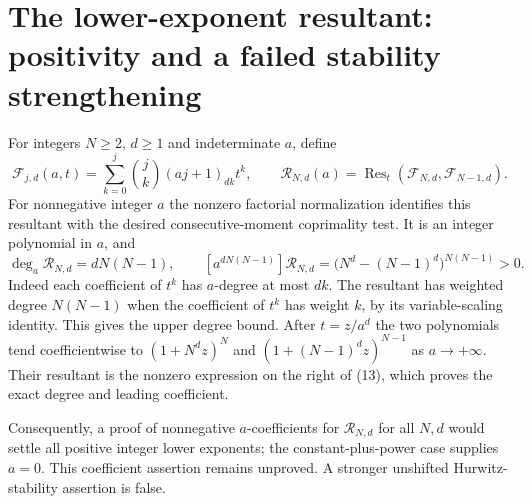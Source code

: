 \documentclass[11pt]{article}
\begin{document}
\section{The lower-exponent resultant: positivity and a failed stability strengthening}
For integers $N\ge2$, $d\ge1$ and indeterminate $a$, define
\[
 \mathcal F_{j,d}(a,t)=
   \sum_{k=0}^j\binom jk(aj+1)_{dk}t^k,\qquad
 \mathcal R_{N,d}(a)=
   \operatorname{Res}_t(\mathcal F_{N,d},\mathcal F_{N-1,d}).
\]
For nonnegative integer $a$ the nonzero factorial normalization
identifies this resultant with the desired consecutive-moment
coprimality test. It is an integer polynomial in $a$, and
\[
 \deg_a\mathcal R_{N,d}=dN(N-1),\qquad
 [a^{dN(N-1)}]\mathcal R_{N,d}
   =\bigl(N^d-(N-1)^d\bigr)^{N(N-1)}>0.                    \tag{13}
\]
Indeed each coefficient of $t^k$ has $a$-degree at most $dk$.
The resultant has weighted degree $N(N-1)$ when the coefficient
of $t^k$ has weight $k$, by its variable-scaling identity.
This gives the upper degree bound.
After $t=z/a^d$ the two polynomials tend coefficientwise to
$(1+N^dz)^N$ and $(1+(N-1)^dz)^{N-1}$ as $a\to+\infty$.
Their resultant is the nonzero expression on the right of (13),
which proves the exact degree and leading coefficient.

Consequently, a proof of nonnegative $a$-coefficients for
$\mathcal R_{N,d}$ for all $N,d$ would settle all positive
integer lower exponents; the constant-plus-power case supplies
$a=0$. This coefficient assertion remains unproved.
A stronger unshifted Hurwitz-stability assertion is false.
\end{document}
